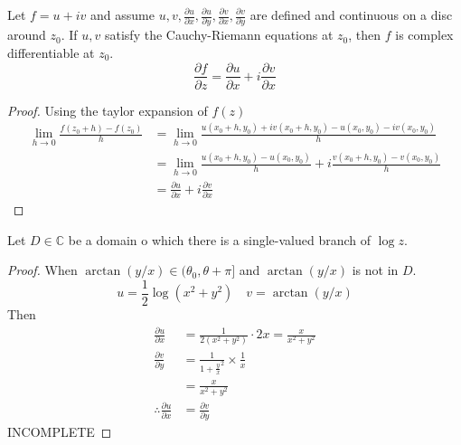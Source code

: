 \begin{theorem}
    Let $f = u + iv$ and assume $u, v, \frac{\partial u}{\partial x}, \frac{\partial u}{\partial y}, \frac{\partial v}{\partial x}, \frac{\partial v}{\partial y}$ are defined and continuous on a disc around $z_0$. If $u, v$ satisfy the Cauchy-Riemann equations at $z_0$, then $f$ is complex differentiable at $z_0$.
    $$\frac{\partial f}{\partial z} = \frac{\partial u}{\partial x} + i\frac{\partial v}{\partial x}$$
\end{theorem}

\begin{proof}
    Using the taylor expansion of $f(z)$
    \begin{align*}
        \lim_{h \to 0} \frac{f(z_0 + h) - f(z_0)}{h} & = \lim_{h \to 0} \frac{u(x_0 + h, y_0) + iv(x_0 + h, y_0) - u(x_0, y_0) - iv(x_0, y_0)}{h}          \\
                                                     & = \lim_{h \to 0} \frac{u(x_0 + h, y_0) - u(x_0, y_0)}{h} + i\frac{v(x_0 + h, y_0) - v(x_0, y_0)}{h} \\
                                                     & = \frac{\partial u}{\partial x} + i\frac{\partial v}{\partial x}
    \end{align*}
\end{proof}


\begin{example}
    Let $D \in \mathbb{C}$ be a domain o which there is a single-valued branch of $\log z$.
\end{example}

\begin{proof}
    When $\arctan(y/x) \in (\theta_0, \theta + \pi]$ and $\arctan(y/x)$ is not in $D$.
    $$u = \frac{1}{2} \log(x^2 + y^2) \quad v = \arctan(y/x)$$
    Then
    \begin{align}
        \frac{\partial u}{\partial x}            & = \frac{1}{2(x^2+ y^2)} \cdot 2x = \frac{x}{x^2 + y^2} \\
        \frac{\partial v}{\partial y}            & = \frac{1}{1 + \frac{y}{x}^2} \times \frac{1}{x}       \\
                                                 & = \frac{x}{x^2 + y^2}                                  \\
        \therefore \frac{\partial u}{\partial x} & = \frac{\partial v}{\partial y}
    \end{align}
    INCOMPLETE
\end{proof}